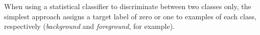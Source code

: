 %
When using a statistical classifier to discriminate between two classes only, the simplest approach assigns a target label of zero or one to examples of each class, respectively (\emph{background} and \emph{foreground}, for example).